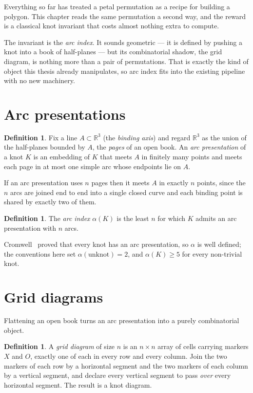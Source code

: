 \documentclass[11pt,oneside]{report}
\theoremstyle{definition}
\newtheorem{definition}[theorem]{Definition}
\newcommand{\R}{\mathbb{R}}
\begin{document}
Everything so far has treated a petal permutation as a recipe for building a
polygon. This chapter reads the same permutation a second way, and the reward
is a classical knot invariant that costs almost nothing extra to compute.

The invariant is the \emph{arc index}. It sounds geometric --- it is defined
by pushing a knot into a book of half-planes --- but its combinatorial
shadow, the grid diagram, is nothing more than a pair of permutations. That
is exactly the kind of object this thesis already manipulates, so arc index
fits into the existing pipeline with no new machinery.

\section{Arc presentations}

\begin{definition}
Fix a line $A \subset \R^3$ (the \emph{binding axis}) and regard $\R^3$ as
the union of the half-planes bounded by $A$, the \emph{pages} of an open
book. An \emph{arc presentation} of a knot $K$ is an embedding of $K$ that
meets $A$ in finitely many points and meets each page in at most one simple
arc whose endpoints lie on $A$.
\end{definition}

If an arc presentation uses $n$ pages then it meets $A$ in exactly $n$
points, since the $n$ arcs are joined end to end into a single closed curve
and each binding point is shared by exactly two of them.

\begin{definition}
The \emph{arc index} $\alpha(K)$ is the least $n$ for which $K$ admits an arc
presentation with $n$ arcs.
\end{definition}

Cromwell~\cite{Cromwell} proved that every knot has an arc presentation, so $\alpha$ is
well defined; the conventions here set $\alpha(\text{unknot}) = 2$, and
$\alpha(K) \geq 5$ for every non-trivial knot.

\section{Grid diagrams}

Flattening an open book turns an arc presentation into a purely
combinatorial object.

\begin{definition}
A \emph{grid diagram} of size $n$ is an $n \times n$ array of cells carrying
markers $X$ and $O$, exactly one of each in every row and every column. Join
the two markers of each row by a horizontal segment and the two markers of
each column by a vertical segment, and declare every vertical segment to
pass \emph{over} every horizontal segment. The result is a knot diagram.
\end{definition}
\end{document}
